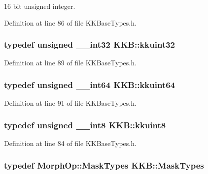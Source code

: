 16 bit unsigned integer. 



Definition at line 86 of file K\+K\+Base\+Types.\+h.

\subsubsection[{\texorpdfstring{kkuint32}{kkuint32}}]{\setlength{\rightskip}{0pt plus 5cm}typedef unsigned \+\_\+\+\_\+int32 {\bf K\+K\+B\+::kkuint32}}\hypertarget{namespace_k_k_b_af8d832f05c54994a1cce25bd5743e19a}{}\label{namespace_k_k_b_af8d832f05c54994a1cce25bd5743e19a}


Definition at line 89 of file K\+K\+Base\+Types.\+h.

\subsubsection[{\texorpdfstring{kkuint64}{kkuint64}}]{\setlength{\rightskip}{0pt plus 5cm}typedef unsigned \+\_\+\+\_\+int64 {\bf K\+K\+B\+::kkuint64}}\hypertarget{namespace_k_k_b_a1f2b0568d3b63cc7697dcff73250113e}{}\label{namespace_k_k_b_a1f2b0568d3b63cc7697dcff73250113e}


Definition at line 91 of file K\+K\+Base\+Types.\+h.

\subsubsection[{\texorpdfstring{kkuint8}{kkuint8}}]{\setlength{\rightskip}{0pt plus 5cm}typedef unsigned \+\_\+\+\_\+int8 {\bf K\+K\+B\+::kkuint8}}\hypertarget{namespace_k_k_b_aebd95e29140dd9220a04bee9cabd648e}{}\label{namespace_k_k_b_aebd95e29140dd9220a04bee9cabd648e}


Definition at line 84 of file K\+K\+Base\+Types.\+h.

\subsubsection[{\texorpdfstring{Mask\+Types}{MaskTypes}}]{\setlength{\rightskip}{0pt plus 5cm}typedef {\bf Morph\+Op\+::\+Mask\+Types} {\bf K\+K\+B\+::\+Mask\+Types}}\hypertarget{namespace_k_k_b_a87b867879b5d8efc10e79ef2ee395a3a}{}\label{namespace_k_k_b_a87b867879b5d8efc10e79ef2ee395a3a}



